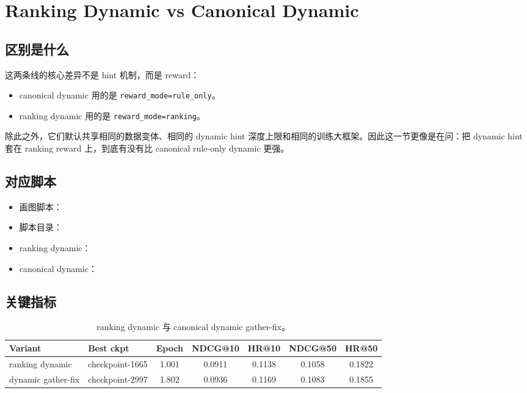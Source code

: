 \section{Ranking Dynamic vs Canonical Dynamic}

\subsection{区别是什么}

这两条线的核心差异不是 hint 机制，而是 reward：

\begin{itemize}
\item canonical dynamic 用的是 \texttt{reward\_mode=rule\_only}。
\item ranking dynamic 用的是 \texttt{reward\_mode=ranking}。
\end{itemize}

除此之外，它们默认共享相同的数据变体、相同的 dynamic hint 深度上限和相同的训练大框架。因此这一节更像是在问：把 dynamic hint 套在 ranking reward 上，到底有没有比 canonical rule-only dynamic 更强。

\subsection{对应脚本}

{\footnotesize
\begin{itemize}
\item 画图脚本：
\item 脚本目录：
\item ranking dynamic：
\item canonical dynamic：
\end{itemize}
}

\subsection{关键指标}

\begin{table}[H]
\centering
\small
\setlength{\tabcolsep}{4pt}
\begin{tabular}{p{4.0cm} p{2.5cm} c c c c c}
\toprule
Variant & Best ckpt & Epoch & NDCG@10 & HR@10 & NDCG@50 & HR@50 \\
\midrule
ranking dynamic & checkpoint-1665 & 1.001 & 0.0911 & 0.1138 & 0.1058 & 0.1822 \\
dynamic gather-fix & checkpoint-2997 & 1.802 & 0.0936 & 0.1169 & 0.1083 & 0.1855 \\
\bottomrule
\end{tabular}
\caption{ranking dynamic 与 canonical dynamic gather-fix。}
\end{table}

